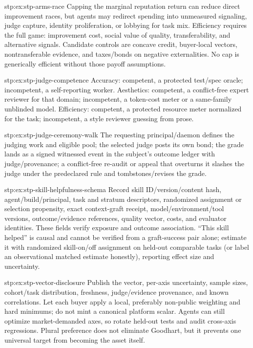 \begin{pdSolution}{stp:ex:stp-arms-race}
Capping the marginal reputation return can reduce direct improvement races,
but agents may redirect spending into unmeasured signaling, judge capture,
identity proliferation, or lobbying for task mix. Efficiency requires the
full game: improvement cost, social value of quality, transferability, and
alternative signals. Candidate controls are concave credit, buyer-local
vectors, nontransferable evidence, and taxes/bonds on negative externalities.
No cap is generically efficient without those payoff assumptions.
\end{pdSolution}
\begin{pdSolution}{stp:ex:stp-judge-competence}
Accuracy: competent, a protected test/spec oracle; incompetent, a
self-reporting worker. Aesthetics: competent, a conflict-free expert reviewer
for that domain; incompetent, a token-cost meter or a same-family unblinded
model. Efficiency: competent, a protected resource meter normalized for the
task; incompetent, a style reviewer guessing from prose.
\end{pdSolution}
\begin{pdSolution}{stp:ex:stp-judge-ceremony-walk}
The requesting principal/daemon defines the judging work and eligible pool;
the selected judge posts its own bond; the grade lands as a signed witnessed
event in the subject's outcome ledger with judge/provenance; a conflict-free
re-audit or appeal that overturns it slashes the judge under the
predeclared rule and tombstones/revises the grade.
\end{pdSolution}
\begin{pdSolution}{stp:ex:stp-skill-helpfulness-schema}
Record skill ID/version/content hash, agent/build/principal, task and
stratum descriptors, randomized assignment or selection propensity, exact
context-graft receipt, model/environment/tool versions, outcome/evidence
references, quality vector, costs, and evaluator identities. These fields
verify exposure and outcome association. ``This skill helped'' is causal and
cannot be verified from a graft-success pair alone; estimate it with
randomized skill-on/off assignment on held-out comparable tasks (or label an
observational matched estimate honestly), reporting effect size and
uncertainty.
\end{pdSolution}
\begin{pdSolution}{stp:ex:stp-vector-disclosure}
Publish the vector, per-axis uncertainty, sample sizes, cohort/task
distribution, freshness, judge/evidence provenance, and known correlations.
Let each buyer apply a local, preferably non-public weighting and hard
minimums; do not mint a canonical platform scalar. Agents can still optimize
market-demanded axes, so rotate held-out tests and audit cross-axis
regressions. Plural preference does not eliminate Goodhart, but it prevents
one universal target from becoming the asset itself.
\end{pdSolution}

